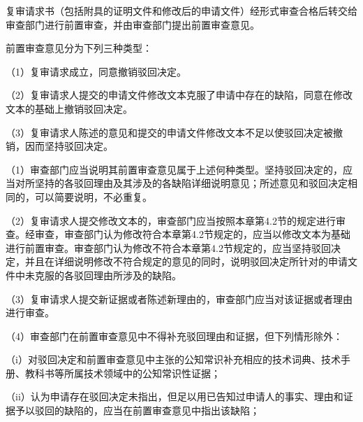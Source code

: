 复审请求书（包括附具的证明文件和修改后的申请文件）经形式审查合格后转交给审查部门进行前置审查，并由审查部门提出前置审查意见。

前置审查意见分为下列三种类型：

{\setlength{\parindent}{17.1bp}（1）复审请求成立，同意撤销驳回决定。\par}

{\setlength{\parindent}{17.1bp}（2）复审请求人提交的申请文件修改文本克服了申请中存在的缺陷，同意在修改文本的基础上撤销驳回决定。\par}

{\setlength{\parindent}{17.1bp}（3）复审请求人陈述的意见和提交的申请文件修改文本不足以使驳回决定被撤销，因而坚持驳回决定。\par}

{\setlength{\parindent}{17.1bp}（1）审查部门应当说明其前置审查意见属于上述何种类型。坚持驳回决定的，应当对所坚持的各驳回理由及其涉及的各缺陷详细说明意见；所述意见和驳回决定相同的，可以简要说明，不必重复。\par}

{\setlength{\parindent}{17.1bp}（2）复审请求人提交修改文本的，审查部门应当按照本章第4.2节的规定进行审查。经审查，审查部门认为修改符合本章第4.2节规定的，应当以修改文本为基础进行前置审查。审查部门认为修改不符合本章第4.2节规定的，应当坚持驳回决定，并且在详细说明修改不符合规定的意见的同时，说明驳回决定所针对的申请文件中未克服的各驳回理由所涉及的缺陷。\par}

{\setlength{\parindent}{17.1bp}（3）复审请求人提交新证据或者陈述新理由的，审查部门应当对该证据或者理由进行审查。\par}

{\setlength{\parindent}{17.1bp}（4）审查部门在前置审查意见中不得补充驳回理由和证据，但下列情形除外：\par}

{\setlength{\parindent}{17.1bp}（i）对驳回决定和前置审查意见中主张的公知常识补充相应的技术词典、技术手册、教科书等所属技术领域中的公知常识性证据；\par}

{\setlength{\parindent}{17.1bp}（ii）认为申请存在驳回决定未指出，但足以用已告知过申请人的事实、理由和证据予以驳回的缺陷的，应当在前置审查意见中指出该缺陷；\par}

